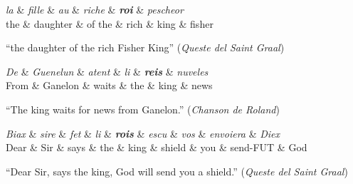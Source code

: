 \begin{center}
    \begin{dependency}[theme=simple]
        \begin{deptext}[row 2/.style={font=\small}]
            \textit{la} \& \textit{fille} \& \textit{au} \& \textit{riche} \& \textbf{\textit{roi}} \& \textit{pescheor} \\
            the \& daughter \& of the \& rich \& king \& fisher \\
        \end{deptext}
    \end{dependency}

    \raggedright
    \enquote{the daughter of the rich Fisher King} (\emph{Queste del Saint Graal})
\end{center}

\begin{center}
    \begin{dependency}[theme=simple]
        \begin{deptext}[row 2/.style={font=\small}]
            \textit{De} \& \textit{Guenelun} \& \textit{atent} \& \textit{li} \& \textbf{\textit{reis}} \& \textit{nuveles} \\
            From \& Ganelon \& waits \& the \& king \& news \\
        \end{deptext}
    \end{dependency}

    \raggedright
    \enquote{The king waits for news from Ganelon.} (\emph{Chanson de Roland})
\end{center}

\begin{center}
    \begin{dependency}[theme=simple]
        \begin{deptext}[row 2/.style={font=\small}]
            \textit{Biax} \& \textit{sire} \& \textit{fet} \& \textit{li} \& \textbf{\textit{rois}} \& \textit{escu} \& \textit{vos} \& \textit{envoiera} \& \textit{Diex} \\
            Dear \& Sir \& says \& the \& king \& shield \& you \& send-FUT \& God \\
        \end{deptext}
    \end{dependency}

    \raggedright
    \enquote{Dear Sir, says the king, God will send you a shield.} (\emph{Queste del Saint Graal})
\end{center}

